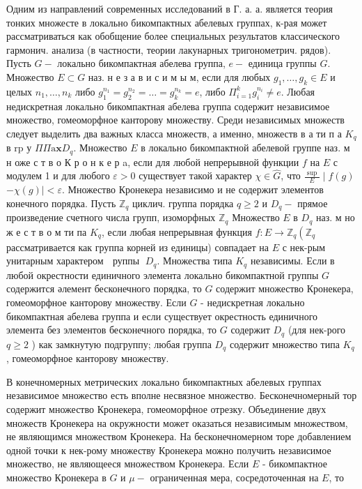 \documentclass[10pt]{article}
\begin{document}
Одним из направлений современных исследований в Г. а. а. является теория тонких множесте в локально бикомпактных абелевых группах, к-рая может рассматриваться как обобщение более специальных результатов классического гармонич. анализа (в частности, теории лакунарных тригонометрич. рядов). Пусть $G-$ локально бикомпактная абелева группа, $e-$ единица группы $G$. Множество $E \subset G$ наз. н е з а в и с и м ы м, если для любых $g_{1}, \ldots, g_{k} \in E$ и целых $n_{1}, \ldots, n_{k}$ либо $g_{1}^{n_{1}}=g_{2}^{n_{2}}=\ldots=g_{k}^{n_{k}}=e$, либо $\Pi_{i=1}^{k} g_{i}^{n_{i}} \neq e$. Любая недискретная локально бикомпактная абелева группа содержит независимое множество, гомеоморфное канторову множеству. Среди независимых множеств следует выделить два важных класса множеств, а именно, множеств в а ти п а $K_{q}$ в $\mathrm{r} \mathrm{p}$ у $\Pi \Pi \mathrm{a} \mathbf{x} D_{q}$. Множество $E$ в локально бикомпактной абелевой группе наз. м н оже с т в о К р о н к е р a, если для любой непрерывной функции $f$ на $E$ с модулем 1 и для любого $\varepsilon>0$ существует такой характер $\chi \in \widehat{G}$, что $\frac{\text { sup }}{E} \mid f(g)$ $-\chi(g) \mid<\varepsilon$. Множество Кронекера независимо и не содержит элементов конечного порядка. Пусть $\mathbb{Z}_{q}$ циклич. группа порядка $q \geqslant 2$ и $D_{q}-$ прямое произведение счетного числа групп, изоморфных $\mathbb{Z}_{q}$ Множество $E$ в $D_{q}$ наз. м но ж е с т в о м ти па $K_{q}$, если любая непрерывная функция $f: E \rightarrow \mathbb{Z}_{q}\left(\mathbb{Z}_{q}\right.$ рассматривается как группа корней из единицы) совпадает на $E$ с нек-рым унитарным характером $\operatorname{~руппы~} D_{q}$. Множества типа $K_{q}$ независимы. Если в любой окрестности единичного элемента локально бикомпактной группы $G$ содержится әлемент бесконечного порядка, то $G$ содержит множество Кронекера, гомеоморфное канторову множеству. Если $G$ - недискретная локально бикомпактная абелева группа и если существует окрестность единичного элемента без элементов бесконечного порядка, то $G$ содержит $D_{q}$ (для нек-рого $q \geqslant 2$ ) как замкнутую подгруппу; любая группа $D_{q}$ содержит множество типа $K_{q}$, гомеоморфное канторову множеству.



В конечномерных метрических локально бикомпактных абелевых группах независимое множество есть вполне несвязное множество. Бесконечномерный тор содержит множество Кронекера, гомеоморфное отрезку. Объединение двух множеств Кронекера на окружности может оказаться независимым множеством, не являющимся множеством Кронекера. На бесконечномерном торе добавлением одной точки к нек-рому множеству Кронекера можно получить независимое множество, не являющееся множеством Кронекера. Если $E$ - бикомпактное множество Кронекера в $G$ и $\mu-$ ограниченная мера, сосредоточенная на $E$, то
\end{document}
